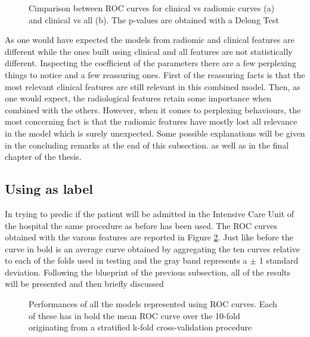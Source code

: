 \begin{figure}[H]
\centering
        \caption{Cimparison between ROC curves for clinical vs radiomic curves (a) and clinical vs all (b). The p-values are obtained with a Delong Test }\label{fig:delongDeath}
\end{figure}

As one would have expected the models from radiomic and clinical features are different while the ones built using clinical and all features are not statistically different. Inspecting the coefficient of the parameters there are a few perplexing things to notice and a few reassuring ones. First of the reassuring facts is that the most relevant clinical features are still relevant in this combined model. Then, as one would expect, the radiological features retain some importance when combined with the others. However, when it comes to perplexing behaviours, the most concerning fact is that the radiomic features have mostly lost all relevance in the model which is surely unexpected. Some possible explanations will be given in the concluding remarks at the end of this  subsection. as well as in the final chapter of the thesis.

\subsection{Using \icu as label}

In trying to predic if the patient will be admitted in the Intensive Care Unit of the hospital the same procedure as before has been used. The ROC curves obtained with the varous features are reported in Figure \ref{fig:ICULasso}. Just like before the curve in bold is an average curve obtained by aggregating the ten curves relative to each of the folds used in testing and the gray band represents a $\pm$ 1 standard deviation. Following the blueprint of the previous subsection, all of the results will be presented and then  briefly discussed


\begin{figure}[H]
\centering
	\newline
        \caption{Performances of all the models represented using ROC curves. Each of these has in bold the mean ROC curve over the 10-fold originating from a stratified k-fold cross-validation procedure}\label{fig:ICULasso}
\end{figure}

